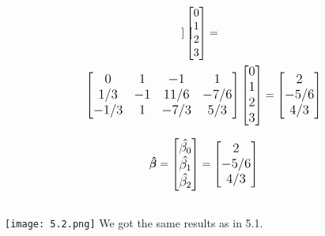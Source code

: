 \documentclass{homework2_template}
\begin{document}
\begin{equation*}
\begin{gathered}
{\begin{bmatrix}
\end{bmatrix}
\begin{bmatrix}
0 \\
1 \\
2 \\
3
\end{bmatrix} = } \\
{\large
\begin{bmatrix}
0 &	1 &	-1 & 1 \\
1/3 & -1 &	11/6 &	-7/6 \\
-1/3 &	1 &	-7/3 &	5/3
\end{bmatrix}
\begin{bmatrix}
0 \\
1 \\
2 \\
3
\end{bmatrix} = 
\begin{bmatrix}
2 \\
-5/6 \\
4/3
\end{bmatrix}
}
\end{gathered}
\end{equation*}

\begin{equation*}
{\large
\bm{\hat{\beta}} = 
\begin{bmatrix}
   \hat{\beta_0} \\ 
   \hat{\beta_1} \\
   \hat{\beta_2}
\end{bmatrix} =
\begin{bmatrix}
2 \\
-5/6 \\
4/3
\end{bmatrix}}
\end{equation*}

\subsection{}
\texttt{[image: 5.2.png]}
We got the same results as in 5.1.
\end{document}
